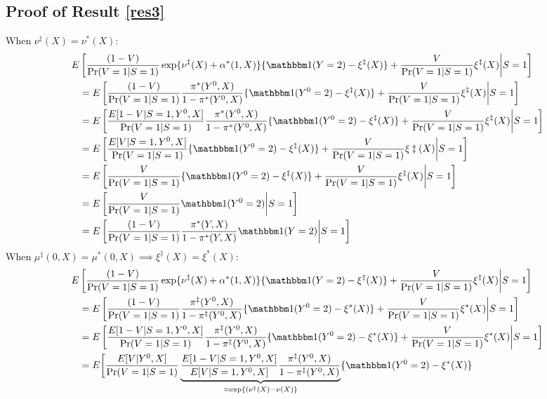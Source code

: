 \documentclass[12pt]{article}
\begin{document}
\begin{appendix}
\section{Proof of Result \ref{res3}}\label{sec:proof3}
When $\nu^\ddagger(X) = \nu^*(X)$:
\begin{align*}
    E&\left[\dfrac{(1 - V)}{\Pr(V=1|S=1)} \exp\{\nu^\ddagger(X) + \alpha^*(1,X)\}\{\mathbbm 1(Y = 2) - \xi^\ddagger(X)\} + \dfrac{V}{\Pr(V=1|S=1)}\xi^\ddagger(X) \bigg|S=1\right]\\
     &= E\left[\dfrac{(1 - V)}{\Pr(V=1|S=1)}  \dfrac{\pi^*(Y^0,X)}{1-\pi^*(Y^0,X)} \{\mathbbm 1(Y^0 = 2) - \xi^\ddagger(X)\}  + \dfrac{V}{\Pr(V=1|S=1)}\xi^\ddagger(X)\bigg|S=1\right] \\
      &= E\left[\dfrac{E[1-V|S=1,Y^0, X]}{\Pr(V=1|S=1)}   \dfrac{\pi^*(Y^0,X)}{1-\pi^*(Y^0,X)}\{\mathbbm 1(Y^0 = 2) - \xi^\ddagger(X)\} + \dfrac{V}{\Pr(V=1|S=1)}\xi^\ddagger(X)\bigg|S=1\right]\\
       &= E\left[\dfrac{E[V|S=1,Y^0, X]}{\Pr(V=1|S=1)} \{\mathbbm 1(Y^0 = 2) - \xi^\ddagger(X)\} + \dfrac{V}{\Pr(V=1|S=1)}\xi\ddagger(X)\bigg|S=1\right] \\
       &= E\left[\dfrac{V}{\Pr(V=1|S=1)} \{\mathbbm 1(Y^0 = 2) - \xi^\ddagger(X)\} + \dfrac{V}{\Pr(V=1|S=1)}\xi^\ddagger(X)\bigg|S=1\right]\\
       &= E\left[\dfrac{V}{\Pr(V=1|S=1)} \mathbbm 1(Y^0 = 2) \bigg|S=1\right]\\
       &= E\left[\dfrac{(1 - V)}{\Pr(V=1|S=1)}  \dfrac{\pi^*(Y,X)}{1-\pi^*(Y,X)} \mathbbm 1(Y = 2) \bigg|S=1\right]
\end{align*}
When $\mu^\ddagger(0,X) = \mu^*(0,X) \implies \xi^\ddagger(X) = \xi^*(X)$:
\begin{align*}
     E&\left[\dfrac{(1 - V)}{\Pr(V=1|S=1)} \exp\{\nu^\ddagger(X) + \alpha^*(1,X)\}\{\mathbbm 1(Y = 2) - \xi^\ddagger(X)\} + \dfrac{V}{\Pr(V=1|S=1)}\xi^\ddagger(X) \bigg|S=1 \right]\\
     &= E\left[\dfrac{(1 - V)}{\Pr(V=1|S=1)} \dfrac{\pi^\ddagger(Y^0,X)}{1-\pi^\ddagger(Y^0, X)}\{\mathbbm 1(Y^0 = 2) - \xi^*(X)\} + \dfrac{V}{\Pr(V=1|S=1)}\xi^*(X)\bigg|S=1 \right] \\
      &= E\left[\dfrac{E[1-V|S=1,Y^0, X] }{\Pr(V=1|S=1)} \dfrac{\pi^\ddagger(Y^0,X)}{1-\pi^\ddagger(Y^0, X)}\{\mathbbm 1(Y^0 = 2) - \xi^*(X)\} + \dfrac{V}{\Pr(V=1|S=1)}\xi^*(X)\bigg|S=1 \right] \\
      &= E\bigg[\dfrac{ E[V|Y^0, X]}{\Pr(V=1|S=1)}\underbrace{\dfrac{E[1-V|S=1,Y^0, X]}{E[V|S=1,Y^0, X]} \dfrac{\pi^\ddagger(Y^0,X)}{1-\pi^\ddagger(Y^0, X)}}_{=\exp\{(\nu^\ddagger(X) - \nu(X)\}}\{\mathbbm 1(Y^0 = 2) - \xi^*(X)\}  \\

\end{align*}
\end{appendix}
\end{document}
